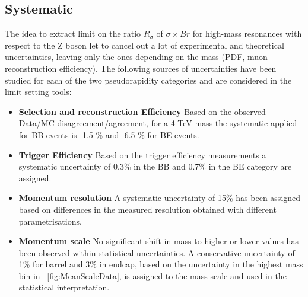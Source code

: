 \subsection{Systematic} 
The idea to extract limit on the ratio $R_{\sigma}$ of $\sigma \times Br$ for high-mass resonances with respect to the Z boson let to cancel out a lot of experimental and theoretical uncertainties, leaving only the ones depending on the mass (\eg PDF, muon reconstruction efficiency). The following sources of uncertainties have been studied for each of the two pseudorapidity categories and are considered in the limit setting tools:

 \begin{itemize}
 \item \textbf{Selection and reconstruction Efficiency} Based on the observed Data/MC disagreement/agreement, for a 4 TeV mass the systematic applied for BB events is -1.5 \% and -6.5 \% for BE events.
 \item \textbf{Trigger Efficiency} Based on the trigger efficiency measurements a systematic uncertainty of 0.3\% in the BB and 0.7\% in the BE category are assigned.
 \item \textbf{Momentum resolution} A systematic uncertainty of 15\% has been assigned based on differences in the measured resolution obtained with different parametrisations.
 \item \textbf{Momentum scale}  No significant shift in mass to higher or lower values has been observed within statistical uncertainties. A conservative uncertainty of 1\% for barrel and 3\% in endcap, based on the uncertainty in the highest mass bin in \figurename~\ref{fig:MeanScaleData}, is assigned to the mass scale and used in the statistical interpretation. 
 \end{itemize}



